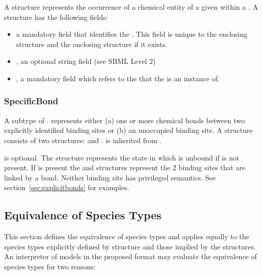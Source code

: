 \documentclass{cekarticle}
\begin{document}
A  structure represents the occurrence of a chemical entity of a given
 within a .  A  structure has the
following fields:

\begin{itemize}

\item {} a mandatory  field that identifies the .
This field is unique to the enclosing  structure and the enclosing
 structure if it exists.

\item {}, an optional string field (see SBML Level 2)

\item {}, a mandatory  field which refers to the 
that the  is an instance of.

\end{itemize}

\subsubsection{SpecificBond}

A subtype of .    represents
either (a) one or more chemical bonds between two explicitly
identified binding sites or (b) an unoccupied binding site.  A
 structure consists of two
 structures:  and
.  is
inherited from .

 is optional. The
 structure represents the state in which
 is unbound if
 is not present. If
 is present the
 and 
structures represent the 2 binding sites that are linked by a
bond. Neither binding site has privileged semantics. See
section~\ref{sec:explicitbonds} for examples.

\subsection{Equivalence of Species Types}
\label{sec:type-equals}

This section defines the equivalence of species types and applies
equally to the species types explicitly defined by
 structure and those implied by the
 structures.  An interpreter of models in the
proposed format may evaluate the equivalence of species types for
two reasons:
\end{document}
